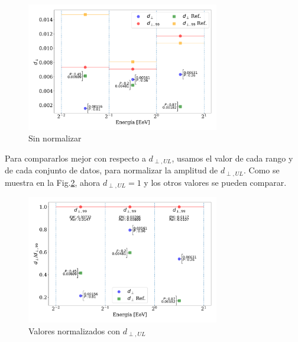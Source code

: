 \documentclass[11pt,papel,oneside,singlespace]{ibtesis}
\begin{document}
    \begin{figure}[H]
        \begin{small}
            \begin{center}
                \includegraphics[width=0.75\textwidth]{d_perp_no_normalizado_v2.pdf}
            \end{center}
            \caption{Sin normalizar}
            \label{fig:no_normalizado}
        \end{small}
    \end{figure}
    
    Para compararlos mejor con respecto a $d_{\perp,UL}$, usamos el valor de cada rango y de cada conjunto de datos, para normalizar la amplitud de $d_{\perp,UL}$. Como se muestra en la Fig.\ref{fig:normalizado}, ahora $d_{\perp,UL}=1$ y los otros valores se pueden comparar. 

    \begin{figure}[H]
        \begin{small}
            \begin{center}
                \includegraphics[width=0.75\textwidth]{d_perp_normalizado.pdf}
            \end{center}
            \caption{Valores normalizados con $d_{\perp,UL}$}
            \label{fig:normalizado}
        \end{small}
    \end{figure}
\end{document}
